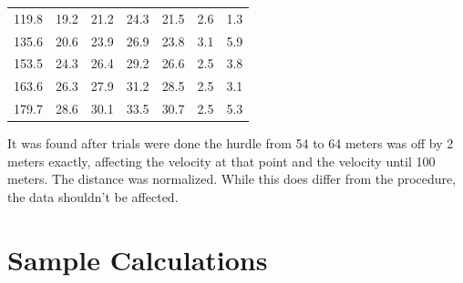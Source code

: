 \documentclass[index]{subfiles}
\begin{document}
\begin{table}[H]
\begin{tabular}{@{}ccccccc@{}}
        119.8            & 19.2                             & 21.2    & 24.3    & 21.5            & 2.6            & 1.3            \\
        135.6            & 20.6                             & 23.9    & 26.9    & 23.8            & 3.1            & 5.9            \\
        153.5            & 24.3                             & 26.4    & 29.2    & 26.6            & 2.5            & 3.8            \\
        163.6            & 26.3                             & 27.9    & 31.2    & 28.5            & 2.5            & 3.1            \\
        179.7            & 28.6                             & 30.1    & 33.5    & 30.7            & 2.5            & 5.3
    \end{tabular}
\end{table}

It was found after trials were done the hurdle from 54 to 64 meters was off by 2 meters exactly, affecting the velocity at that point and the velocity until 100 meters. The distance was normalized. While this does differ from the procedure, the data shouldn't be affected.

\section{Sample Calculations}
\end{document}
